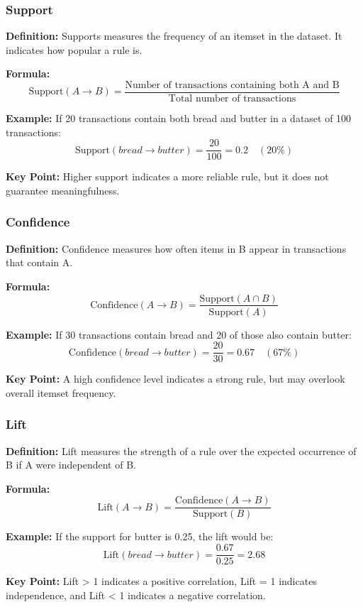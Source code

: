 \documentclass{beamer}
\begin{document}
\begin{frame}[fragile]
    \frametitle{Support}
    \textbf{Definition:} Supports measures the frequency of an itemset in the dataset. It indicates how popular a rule is.

    \textbf{Formula:}  
    \begin{equation}
        \text{Support}(A \rightarrow B) = \frac{\text{Number of transactions containing both A and B}}{\text{Total number of transactions}}
    \end{equation}

    \textbf{Example:} If 20 transactions contain both bread and butter in a dataset of 100 transactions:
    \[
    \text{Support}(bread \rightarrow butter) = \frac{20}{100} = 0.2 \quad (20\%)
    \]
    
    \textbf{Key Point:} Higher support indicates a more reliable rule, but it does not guarantee meaningfulness.
\end{frame}

\begin{frame}[fragile]
    \frametitle{Confidence}
    \textbf{Definition:} Confidence measures how often items in B appear in transactions that contain A.

    \textbf{Formula:}  
    \begin{equation}
        \text{Confidence}(A \rightarrow B) = \frac{\text{Support}(A \cap B)}{\text{Support}(A)}
    \end{equation}

    \textbf{Example:} If 30 transactions contain bread and 20 of those also contain butter:
    \[
    \text{Confidence}(bread \rightarrow butter) = \frac{20}{30} = 0.67 \quad (67\%)
    \]

    \textbf{Key Point:} A high confidence level indicates a strong rule, but may overlook overall itemset frequency.
\end{frame}

\begin{frame}[fragile]
    \frametitle{Lift}
    \textbf{Definition:} Lift measures the strength of a rule over the expected occurrence of B if A were independent of B.

    \textbf{Formula:}  
    \begin{equation}
        \text{Lift}(A \rightarrow B) = \frac{\text{Confidence}(A \rightarrow B)}{\text{Support}(B)}
    \end{equation}

    \textbf{Example:} If the support for butter is 0.25, the lift would be:
    \[
    \text{Lift}(bread \rightarrow butter) = \frac{0.67}{0.25} = 2.68
    \]

    \textbf{Key Point:} Lift > 1 indicates a positive correlation, Lift = 1 indicates independence, and Lift < 1 indicates a negative correlation.
\end{frame}
\end{document}
